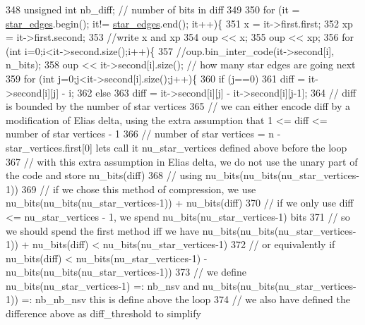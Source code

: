 \begin{DoxyCode}
348   \textcolor{keywordtype}{unsigned} \textcolor{keywordtype}{int} nb\_diff; \textcolor{comment}{// number of bits in diff}
349 
350   \textcolor{keywordflow}{for} (it = \hyperlink{classmarked__graph__compressed_a7df5779d313486644132bd816937f532}{star\_edges}.begin(); it!= \hyperlink{classmarked__graph__compressed_a7df5779d313486644132bd816937f532}{star\_edges}.end(); it++)\{
351     x = it->first.first;
352     xp = it->first.second;
353     \textcolor{comment}{//write x and xp}
354     oup << x;
355     oup << xp;
356     \textcolor{keywordflow}{for} (\textcolor{keywordtype}{int} i=0;i<it->second.size();i++)\{
357       \textcolor{comment}{//oup.bin\_inter\_code(it->second[i], n\_bits);}
358       oup << it->second[i].size(); \textcolor{comment}{// how many star edges are going next}
359       \textcolor{keywordflow}{for} (\textcolor{keywordtype}{int} j=0;j<it->second[i].size();j++)\{
360         \textcolor{keywordflow}{if} (j==0)
361           diff = it->second[i][j] - i;
362         \textcolor{keywordflow}{else}
363           diff = it->second[i][j] - it->second[i][j-1];
364         \textcolor{comment}{// diff is bounded by the number of star vertices}
365         \textcolor{comment}{// we can either encode diff by a modification of Elias delta, using the extra assumption that 1 <=
       diff <= number of star vertices - 1}
366         \textcolor{comment}{// number of star vertices = n - star\_vertices.first[0] lets call it nu\_star\_vertices defined above
       before the loop}
367         \textcolor{comment}{// with this extra assumption in Elias delta, we do not use the unary part of the code and store
       nu\_bits(diff) }
368         \textcolor{comment}{// using nu\_bits(nu\_bits(nu\_star\_vertices-1))}
369         \textcolor{comment}{// if we chose this method of compression, we use nu\_bits(nu\_bits(nu\_star\_vertices-1)) +
       nu\_bits(diff)}
370         \textcolor{comment}{// if we only use diff <= nu\_star\_vertices - 1, we spend nu\_bits(nu\_star\_vertices-1) bits}
371         \textcolor{comment}{// so we should spend the first method iff we have nu\_bits(nu\_bits(nu\_star\_vertices-1)) +
       nu\_bits(diff) < nu\_bits(nu\_star\_vertices-1)}
372         \textcolor{comment}{// or equivalently if nu\_bits(diff) < nu\_bits(nu\_star\_vertices-1) -
       nu\_bits(nu\_bits(nu\_star\_vertices-1))}
373         \textcolor{comment}{// we define  nu\_bits(nu\_star\_vertices-1) =: nb\_nsv and nu\_bits(nu\_bits(nu\_star\_vertices-1)) =:
       nb\_nb\_nsv this is define above the loop}
374         \textcolor{comment}{// we also have defined the difference above as diff\_threshold to simplify}

\end{DoxyCode}
